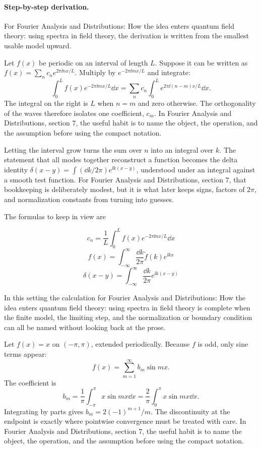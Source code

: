 \paragraph{Step-by-step derivation.}

For Fourier Analysis and Distributions: How the idea enters quantum field theory: using spectra in field theory, the derivation is written from the smallest usable model upward.

Let \(f(x)\) be periodic on an interval of length \(L\).  Suppose it can be written as \(f(x)=\sum_n c_ne^{2\pi\ii nx/L}\).  Multiply by \(e^{-2\pi\ii mx/L}\) and integrate:
\[
  \int_0^L f(x)e^{-2\pi\ii mx/L}\dd x
  =
  \sum_n c_n\int_0^L e^{2\pi\ii(n-m)x/L}\dd x.
\]
The integral on the right is \(L\) when \(n=m\) and zero otherwise.  The orthogonality of the waves therefore isolates one coefficient, \(c_m\).  In Fourier Analysis and Distributions, section 7, the useful habit is to name the object, the operation, and the assumption before using the compact notation.

Letting the interval grow turns the sum over \(n\) into an integral over \(k\).  The statement that all modes together reconstruct a function becomes the delta identity \(\delta(x-y)=\int(\dd k/2\pi)e^{\ii k(x-y)}\), understood under an integral against a smooth test function.  For Fourier Analysis and Distributions, section 7, that bookkeeping is deliberately modest, but it is what later keeps signs, factors of \(2\pi\), and normalization constants from turning into guesses.

The formulas to keep in view are

\[
  c_n=\frac1L\int_0^L f(x)e^{-2\pi\ii nx/L}\dd x
\]
\[
  f(x)=\int_{-\infty}^{\infty}\frac{\dd k}{2\pi}\tilde f(k)e^{\ii kx}
\]
\[
  \delta(x-y)=\int_{-\infty}^{\infty}\frac{\dd k}{2\pi}e^{\ii k(x-y)}
\]

In this setting the calculation for Fourier Analysis and Distributions: How the idea enters quantum field theory: using spectra in field theory is complete when the finite model, the limiting step, and the normalization or boundary condition can all be named without looking back at the prose.




\begin{example}
Let \(f(x)=x\) on \((-\pi,\pi)\), extended periodically.  Because \(f\) is odd, only sine terms appear:
\[
  f(x)=\sum_{m=1}^\infty b_m\sin mx.
\]
The coefficient is
\[
  b_m=\frac1\pi\int_{-\pi}^\pi x\sin mx\dd x
  =\frac2\pi\int_0^\pi x\sin mx\dd x.
\]
Integrating by parts gives \(b_m=2(-1)^{m+1}/m\).  The discontinuity at the endpoint is exactly where pointwise convergence must be treated with care.  In Fourier Analysis and Distributions, section 7, the useful habit is to name the object, the operation, and the assumption before using the compact notation.
\end{example}



